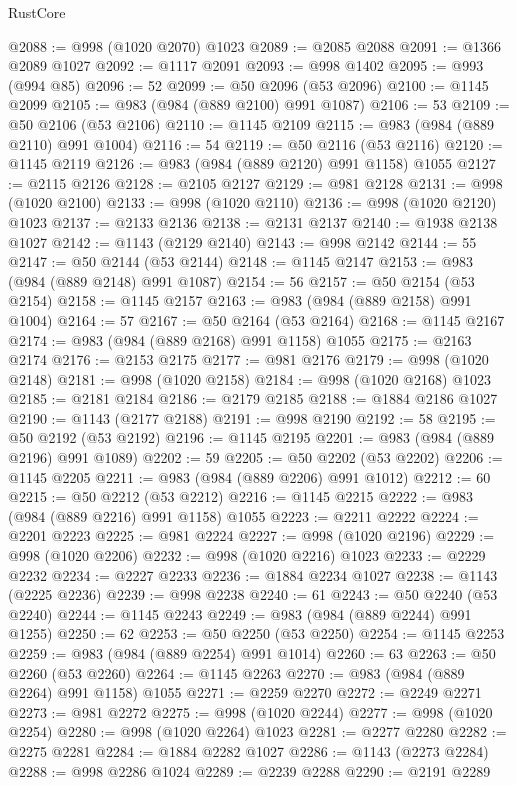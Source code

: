 \begin{lexlean}{RustCore}
\begin{coremodule}
@2088 := @998 (@1020 @2070) @1023
@2089 := @2085 @2088
@2091 := @1366 @2089 @1027
@2092 := @1117 @2091
@2093 := @998 @1402
@2095 := @993 (@994 @85)
@2096 := 52
@2099 := @50 @2096 (@53 @2096)
@2100 := @1145 @2099
@2105 := @983 (@984 (@889 @2100) @991 @1087)
@2106 := 53
@2109 := @50 @2106 (@53 @2106)
@2110 := @1145 @2109
@2115 := @983 (@984 (@889 @2110) @991 @1004)
@2116 := 54
@2119 := @50 @2116 (@53 @2116)
@2120 := @1145 @2119
@2126 := @983 (@984 (@889 @2120) @991 @1158) @1055
@2127 := @2115 @2126
@2128 := @2105 @2127
@2129 := @981 @2128
@2131 := @998 (@1020 @2100)
@2133 := @998 (@1020 @2110)
@2136 := @998 (@1020 @2120) @1023
@2137 := @2133 @2136
@2138 := @2131 @2137
@2140 := @1938 @2138 @1027
@2142 := @1143 (@2129 @2140)
@2143 := @998 @2142
@2144 := 55
@2147 := @50 @2144 (@53 @2144)
@2148 := @1145 @2147
@2153 := @983 (@984 (@889 @2148) @991 @1087)
@2154 := 56
@2157 := @50 @2154 (@53 @2154)
@2158 := @1145 @2157
@2163 := @983 (@984 (@889 @2158) @991 @1004)
@2164 := 57
@2167 := @50 @2164 (@53 @2164)
@2168 := @1145 @2167
@2174 := @983 (@984 (@889 @2168) @991 @1158) @1055
@2175 := @2163 @2174
@2176 := @2153 @2175
@2177 := @981 @2176
@2179 := @998 (@1020 @2148)
@2181 := @998 (@1020 @2158)
@2184 := @998 (@1020 @2168) @1023
@2185 := @2181 @2184
@2186 := @2179 @2185
@2188 := @1884 @2186 @1027
@2190 := @1143 (@2177 @2188)
@2191 := @998 @2190
@2192 := 58
@2195 := @50 @2192 (@53 @2192)
@2196 := @1145 @2195
@2201 := @983 (@984 (@889 @2196) @991 @1089)
@2202 := 59
@2205 := @50 @2202 (@53 @2202)
@2206 := @1145 @2205
@2211 := @983 (@984 (@889 @2206) @991 @1012)
@2212 := 60
@2215 := @50 @2212 (@53 @2212)
@2216 := @1145 @2215
@2222 := @983 (@984 (@889 @2216) @991 @1158) @1055
@2223 := @2211 @2222
@2224 := @2201 @2223
@2225 := @981 @2224
@2227 := @998 (@1020 @2196)
@2229 := @998 (@1020 @2206)
@2232 := @998 (@1020 @2216) @1023
@2233 := @2229 @2232
@2234 := @2227 @2233
@2236 := @1884 @2234 @1027
@2238 := @1143 (@2225 @2236)
@2239 := @998 @2238
@2240 := 61
@2243 := @50 @2240 (@53 @2240)
@2244 := @1145 @2243
@2249 := @983 (@984 (@889 @2244) @991 @1255)
@2250 := 62
@2253 := @50 @2250 (@53 @2250)
@2254 := @1145 @2253
@2259 := @983 (@984 (@889 @2254) @991 @1014)
@2260 := 63
@2263 := @50 @2260 (@53 @2260)
@2264 := @1145 @2263
@2270 := @983 (@984 (@889 @2264) @991 @1158) @1055
@2271 := @2259 @2270
@2272 := @2249 @2271
@2273 := @981 @2272
@2275 := @998 (@1020 @2244)
@2277 := @998 (@1020 @2254)
@2280 := @998 (@1020 @2264) @1023
@2281 := @2277 @2280
@2282 := @2275 @2281
@2284 := @1884 @2282 @1027
@2286 := @1143 (@2273 @2284)
@2288 := @998 @2286 @1024
@2289 := @2239 @2288
@2290 := @2191 @2289

\end{coremodule}
\end{lexlean}
